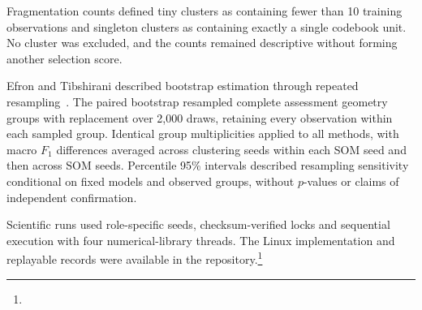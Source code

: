 Fragmentation counts defined tiny clusters as containing fewer than 10 training observations and singleton clusters as containing exactly a single codebook unit. No cluster was excluded, and the counts remained descriptive without forming another selection score.

Efron and Tibshirani described bootstrap estimation through repeated resampling~\cite{efron1993}. The paired bootstrap resampled complete assessment geometry groups with replacement over 2,000 draws, retaining every observation within each sampled group. Identical group multiplicities applied to all methods, with macro $F_1$ differences averaged across clustering seeds within each SOM seed and then across SOM seeds. Percentile 95\% intervals described resampling sensitivity conditional on fixed models and observed groups, without $p$-values or claims of independent confirmation.

Scientific runs used role-specific seeds, checksum-verified locks and sequential execution with four numerical-library threads. The Linux implementation and replayable records were available in the repository.\footnote{}
